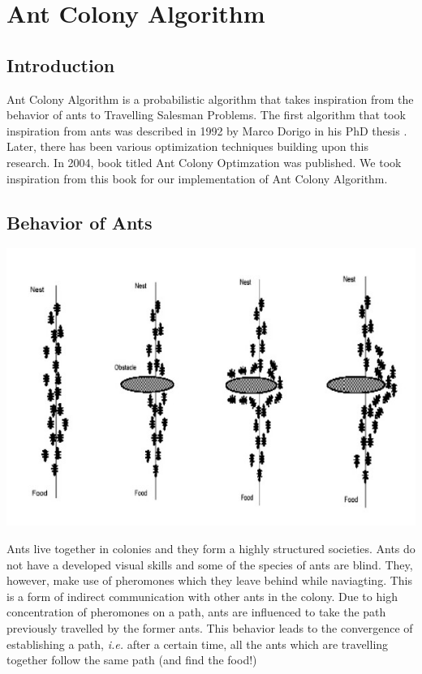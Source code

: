 \documentclass[11pt, english]{article}
\begin{document}
\newpage
\section{Ant Colony Algorithm}

\subsection{Introduction}

Ant Colony Algorithm is a probabilistic algorithm that takes inspiration from the behavior of ants to Travelling Salesman Problems. The first algorithm that took inspiration from ants was described in 1992 by Marco Dorigo in his PhD thesis \cite{Dorigothesis}. Later, there has been various optimization techniques building upon this research. In 2004, book titled Ant Colony Optimzation was published. We took inspiration from this book for our implementation of Ant Colony Algorithm.

\subsection{Behavior of Ants}

\begin{center}
\includegraphics[scale=0.5]{antfood.jpg}
\end{center}

Ants live together in colonies and they form a highly structured societies. Ants do not have a developed visual skills and some of the species of ants are blind. They, however, make use of pheromones which they leave behind while naviagting. This is a form of indirect communication with other ants in the colony. Due to high concentration of pheromones on a path, ants are influenced to take the path previously travelled by the former ants. This behavior leads to the convergence of establishing a path, \emph{i.e.} after a certain time, all the ants which are travelling together follow the same path (and find the food!)
 
\end{document}
